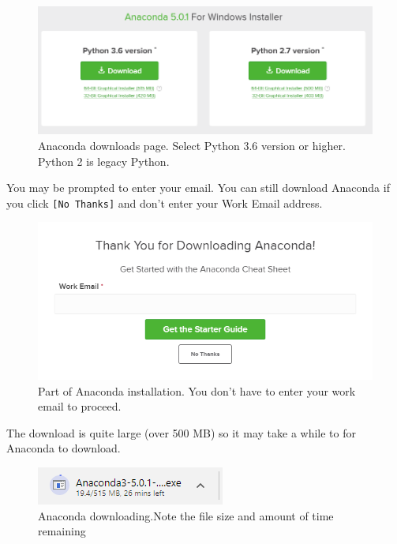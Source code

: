 \documentclass{book}
\makeatletter
\def\maxwidth{\ifdim\Gin@nat@width>\linewidth\linewidth
    \else\Gin@nat@width\fi}
\let\Oldincludegraphics\includegraphics
\renewcommand{\includegraphics}[1]{\Oldincludegraphics[width=.8\maxwidth]{#1}}
\makeatother
\begin{document}
\begin{figure}
\centering
\includegraphics{images/anaconda_python3_or_python2.png}
\caption{Anaconda downloads page. Select Python 3.6 version or higher.
Python 2 is legacy Python.}
\end{figure}

You may be prompted to enter your email. You can still download Anaconda
if you click \lstinline![No Thanks]! and don't enter your Work Email
address.

\begin{figure}
\centering
\includegraphics{images/anaconda_enter_email.png}
\caption{Part of Anaconda installation. You don't have to enter your
work email to proceed.}
\end{figure}

The download is quite large (over 500 MB) so it may take a while to for
Anaconda to download.

\begin{figure}
\centering
\includegraphics{images/anaconda_downloading.png}
\caption{Anaconda downloading.Note the file size and amount of time
remaining}
\end{figure}
    
\end{document}
